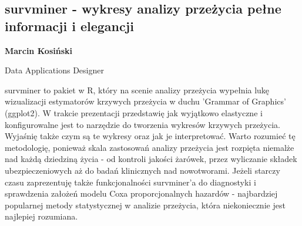 \documentclass[\main/boa.tex]{subfiles}
\begin{document}
\subsection{survminer - wykresy analizy przeżycia pełne informacji i elegancji}

\begin{minipage}{0.915\textwidth}
	\centering
  {\bf {} Marcin Kosiński}
\end{minipage}

\vskip 0.3cm

\begin{affiliations}
\begin{minipage}{0.915\textwidth}
\centering
Data Applications Designer \\[-2pt]
\end{minipage}
\end{affiliations}

\vskip 0.8cm

survminer to pakiet w R, który na scenie analizy przeżycia wypełnia lukę wizualizacji estymatorów krzywych przeżycia w duchu 'Grammar of Graphics' (ggplot2). W trakcie prezentacji przedstawię jak wyjątkowo elastyczne i konfigurowalne jest to narzędzie do tworzenia wykresów krzywych przeżycia. Wyjaśnię także czym są te wykresy oraz jak je interpretować. Warto rozumieć tę metodologię, ponieważ skala zastosowań analizy przeżycia jest rozpięta niemalże nad każdą dziedziną życia - od kontroli jakości żarówek, przez wyliczanie składek ubezpieczeniowych aż do badań klinicznych nad nowotworami. Jeżeli starczy czasu zaprezentuję także funkcjonalności survminer'a do diagnostyki i sprawdzenia założeń modelu Coxa proporcjonalnych hazardów - najbardziej popularnej metody statystycznej w analizie przeżycia, która niekoniecznie jest najlepiej rozumiana. 
\end{document}
